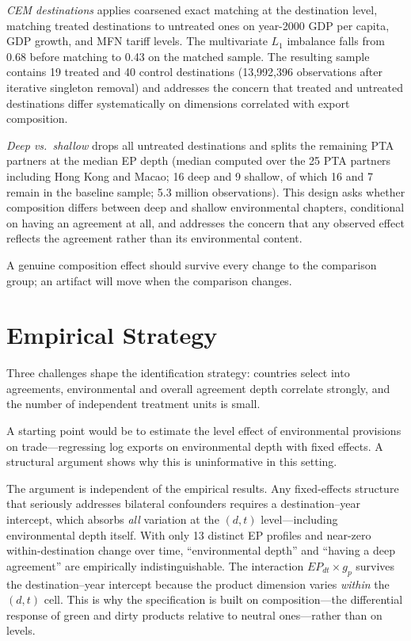 \documentclass[12pt]{article}
\begin{document}
\emph{CEM destinations} applies coarsened exact matching \citep{iacus2012} at the
destination level, matching treated destinations to untreated ones on year-2000 GDP per
capita, GDP growth, and MFN tariff levels. The multivariate $L_1$ imbalance falls from
0.68 before matching to 0.43 on the matched sample. The resulting sample contains 19 treated and
40 control destinations (13,992,396 observations after iterative singleton removal) and addresses the concern that
treated and untreated destinations differ systematically on dimensions correlated with
export composition.

\emph{Deep vs.\ shallow} drops all untreated destinations and splits the remaining PTA
partners at the median EP depth (median computed over the 25 PTA partners including Hong Kong and Macao; 16 deep and 9 shallow, of which 16 and 7 remain in the baseline sample; 5.3 million
observations). This design asks whether composition differs between deep and shallow
environmental chapters, conditional on having an agreement at all, and addresses the
concern that any observed effect reflects the agreement rather than its environmental
content.

A genuine composition effect should survive every change to the comparison group; an artifact will move when the comparison changes.

\section{Empirical Strategy}\label{sec:strategy}

Three challenges shape the identification strategy: countries select into agreements, environmental and overall agreement depth correlate strongly, and the number of independent treatment units is small.

A starting point would be to estimate the level effect of environmental provisions
on trade---regressing log exports on environmental depth with fixed effects. A
structural argument shows why this is uninformative in this setting.

The argument is independent of the empirical results. Any fixed-effects
structure that seriously addresses bilateral confounders requires a destination--year
intercept, which absorbs \emph{all} variation at the $(d,t)$ level---including
environmental depth itself. With only 13 distinct EP profiles and
near-zero within-destination change over time, ``environmental depth'' and ``having a
deep agreement'' are empirically indistinguishable. The interaction
$EP_{dt} \times g_p$ survives the destination--year intercept because the product
dimension varies \emph{within} the $(d,t)$ cell. This is why the specification is
built on composition---the differential response of green and dirty products relative
to neutral ones---rather than on levels.
\end{document}
